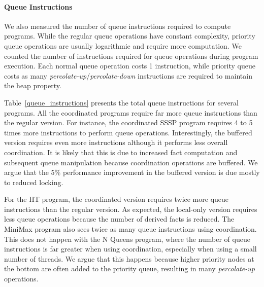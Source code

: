 \paragraph{Queue Instructions}

We also measured the number of queue instructions required to compute programs.
While the regular queue operations have constant complexity, priority queue
operations are usually logarithmic and require more computation. We counted the
number of instructions required for queue operations during program execution.
Each normal queue operation costs 1 instruction, while priority queue costs as
many \emph{percolate-up}/\emph{percolate-down} instructions are required to maintain the heap property.

Table~\ref{queue_instructions} presents the total queue instructions for several
programs. All the coordinated programs require far more queue instructions than
the regular version. For instance, the coordinated SSSP program requires 4 to 5
times more instructions to perform queue operations. Interestingly, the buffered
version requires even more instructions although it performs less overall
coordination. It is likely that this is due to increased fact computation and
subsequent queue manipulation because coordination operations are buffered.
We argue that the 5\% performance improvement in the
buffered version is due mostly to reduced locking.

For the HT program, the coordinated version requires twice more queue
instructions than the regular version. As expected, the local-only version
requires less queue operations because the number of derived facts is reduced.
The MiniMax program also sees twice as many queue instructions using
coordination. This does not happen with the N Queens program, where the number
of queue instructions is far greater when using coordination, especially when
using a small number of threads. We argue that this happens because higher
priority nodes at the bottom are often added to the priority queue, resulting in
many \emph{percolate-up} operations.

